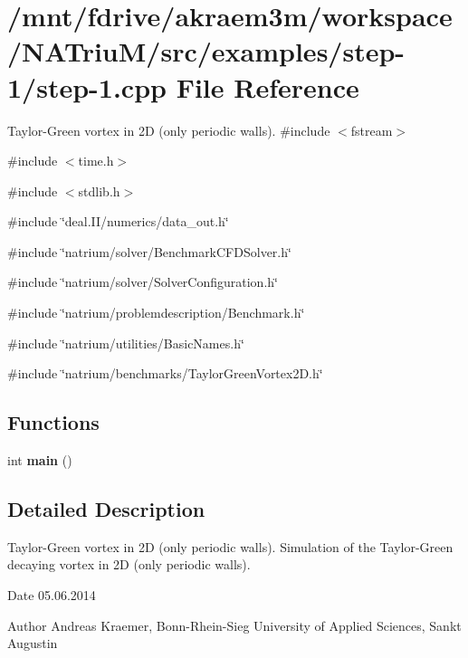 \hypertarget{step-1_8cpp}{
\section{/mnt/fdrive/akraem3m/workspace/NATriuM/src/examples/step-\/1/step-\/1.cpp File Reference}
\label{step-1_8cpp}
}


Taylor-\/Green vortex in 2D (only periodic walls).  
{\ttfamily \#include $<$fstream$>$}\par
{\ttfamily \#include $<$time.h$>$}\par
{\ttfamily \#include $<$stdlib.h$>$}\par
{\ttfamily \#include \char`\"{}deal.II/numerics/data\_\-out.h\char`\"{}}\par
{\ttfamily \#include \char`\"{}natrium/solver/BenchmarkCFDSolver.h\char`\"{}}\par
{\ttfamily \#include \char`\"{}natrium/solver/SolverConfiguration.h\char`\"{}}\par
{\ttfamily \#include \char`\"{}natrium/problemdescription/Benchmark.h\char`\"{}}\par
{\ttfamily \#include \char`\"{}natrium/utilities/BasicNames.h\char`\"{}}\par
{\ttfamily \#include \char`\"{}natrium/benchmarks/TaylorGreenVortex2D.h\char`\"{}}\par
\subsection*{Functions}
\begin{DoxyCompactItemize}
\item 
\hypertarget{step-1_8cpp_ae66f6b31b5ad750f1fe042a706a4e3d4}{
int {\bfseries main} ()}
\label{step-1_8cpp_ae66f6b31b5ad750f1fe042a706a4e3d4}

\end{DoxyCompactItemize}


\subsection{Detailed Description}
Taylor-\/Green vortex in 2D (only periodic walls). Simulation of the Taylor-\/Green decaying vortex in 2D (only periodic walls).

\begin{DoxyDate}{Date}
05.06.2014 
\end{DoxyDate}
\begin{DoxyAuthor}{Author}
Andreas Kraemer, Bonn-\/Rhein-\/Sieg University of Applied Sciences, Sankt Augustin 
\end{DoxyAuthor}
